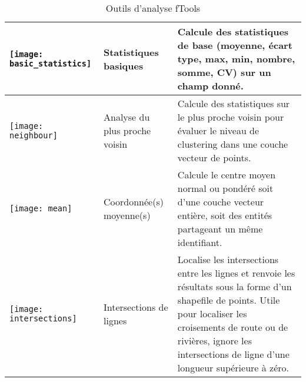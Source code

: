 \begin{table}[ht]
\begin{tabular}{|m{1cm}|m{3cm}|m{12cm}|}
 \hline \texttt{[image: basic\_statistics]} & Statistiques basiques & Calcule des statistiques de base (moyenne, écart type, max, min, nombre, somme, CV) sur un champ donné. \\ 
 \hline \texttt{[image: neighbour]} & Analyse du plus proche voisin & Calcule des statistiques sur le plus proche voisin pour évaluer le niveau de clustering dans une couche vecteur de points. \\
 \hline \texttt{[image: mean]} & Coordonnée(s) moyenne(s) & Calcule le centre moyen normal ou pondéré soit d'une couche vecteur entière, soit des entités partageant un même identifiant. \\ 
 \hline \texttt{[image: intersections]} & Intersections de lignes & Localise les intersections entre les lignes et renvoie les résultats sous la forme d'un shapefile de points. Utile pour localiser les croisements de route ou de rivières, ignore les intersections de ligne d'une longueur supérieure à zéro. \\
 \hline
\end{tabular}
\caption{Outils d'analyse fTools}\label{tab:ftool_analysis}
\end{table}

